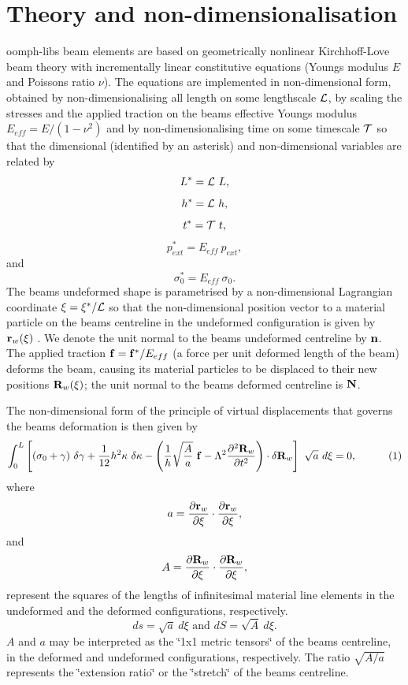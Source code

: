 \hypertarget{index_non_dim}{}\section{Theory and non-\/dimensionalisation}\label{index_non_dim}
{\ttfamily oomph-\/lib\textquotesingle{}s} beam elements are based on geometrically nonlinear Kirchhoff-\/\+Love beam theory with incrementally linear constitutive equations (Young\textquotesingle{}s modulus $ E $ and Poisson\textquotesingle{}s ratio $ \nu $). The equations are implemented in non-\/dimensional form, obtained by non-\/dimensionalising all length on some lengthscale $ {\cal L} $, by scaling the stresses and the applied traction on the beam\textquotesingle{}s effective Young\textquotesingle{}s modulus $ E_{eff} = E/(1-\nu^2) $ and by non-\/dimensionalising time on some timescale $ {\cal T} $ so that the dimensional (identified by an asterisk) and non-\/dimensional variables are related by \[ L^* = {\cal L} \ L, \] \[ h^* = {\cal L} \ h, \] \[ t^* = {\cal T} \ t, \] \[ p_{ext}^* = E_{eff} \ p_{ext}, \] and \[ \sigma_0^* = E_{eff} \ \sigma_0. \] The beam\textquotesingle{}s undeformed shape is parametrised by a non-\/dimensional Lagrangian coordinate $ \xi = \xi^*/{\cal L} $ so that the non-\/dimensional position vector to a material particle on the beam\textquotesingle{}s centreline in the undeformed configuration is given by $ {\bf r}_w(\xi) $ . We denote the unit normal to the beam\textquotesingle{}s undeformed centreline by $ {\bf n} $. The applied traction $ {\bf f} = {\bf f}^*/E_{eff} $ (a force per unit deformed length of the beam) deforms the beam, causing its material particles to be displaced to their new positions $ {\bf R}_w(\xi) $; the unit normal to the beam\textquotesingle{}s deformed centreline is $ {\bf N} $.

The non-\/dimensional form of the principle of virtual displacements that governs the beams deformation is then given by \[ \int_0^{L} \left[ (\sigma_0 + \gamma) \ \delta \gamma + \frac{1}{12} h^2 \kappa \ \delta \kappa - \left(\frac{1}{h} \sqrt{\frac{A}{a}} \ {\bf f} - \Lambda^2 \frac{\partial^2 {\bf R}_w}{\partial t^2} \right) \cdot \delta {\bf R}_w \right] \ \sqrt{a} \ d\xi = 0, \ \ \ \ \ \ \ \ \ (1) \] where \[ a = \frac{\partial {\bf r}_w}{\partial \xi} \cdot \frac{\partial {\bf r}_w}{\partial \xi}, \] and \[ A = \frac{\partial {\bf R}_w}{\partial \xi} \cdot \frac{\partial {\bf R}_w}{\partial \xi}, \] represent the squares of the lengths of infinitesimal material line elements in the undeformed and the deformed configurations, respectively. \[ ds = \sqrt{a} \ d\xi \mbox{\ \ \ \ and \ \ \ } dS = \sqrt{A} \ d\xi. \] $ A $ and $ a $ may be interpreted as the \char`\"{}1x1 metric
tensors\char`\"{} of the beam\textquotesingle{}s centreline, in the deformed and undeformed configurations, respectively. The ratio $ \sqrt{A/a} $ represents the \char`\"{}extension ratio\char`\"{} or the \char`\"{}stretch\char`\"{} of the beam\textquotesingle{}s centreline.


